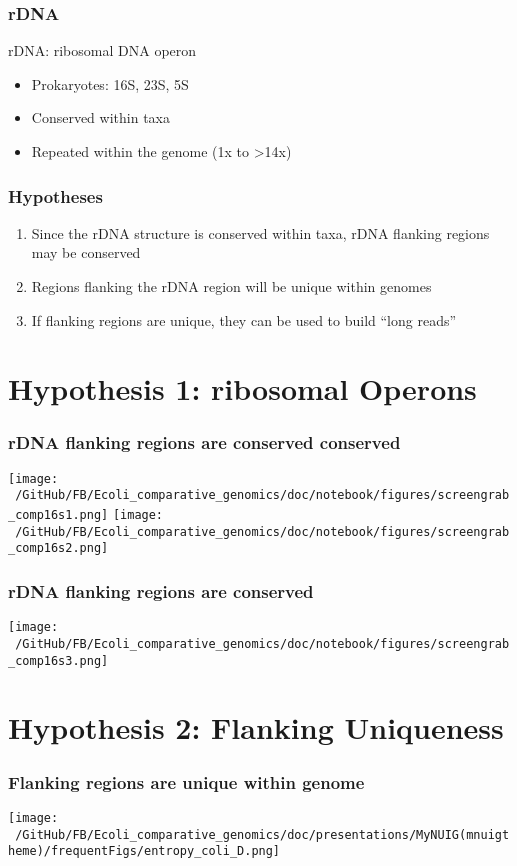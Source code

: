 \documentclass[10pt, compress]{beamer}
\begin{document}
\begin{frame}[fragile]
  \frametitle{rDNA}
  rDNA: ribosomal DNA operon
  \begin{itemize}
    \item Prokaryotes: 16S, 23S, 5S
    \item Conserved within taxa
    \item Repeated within the genome (1x to >14x)
    \end{itemize}
\end{frame}

\begin{frame}[fragile]
\frametitle{Hypotheses}
  \begin{enumerate}
  \item Since the rDNA structure is conserved within taxa, rDNA flanking regions may be conserved
  \item Regions flanking the rDNA region will be unique within genomes
  \item If flanking regions are unique, they can be used to build ``long reads''
\end{enumerate}
\end{frame}

\section{Hypothesis 1: ribosomal Operons}

\begin{frame}[fragile]
  \frametitle{rDNA flanking regions are conserved conserved}
  \centering
  \texttt{[image: ~/GitHub/FB/Ecoli\_comparative\_genomics/doc/notebook/figures/screengrab\_comp16s1.png]}
  \hfill
  \texttt{[image: ~/GitHub/FB/Ecoli\_comparative\_genomics/doc/notebook/figures/screengrab\_comp16s2.png]}
\end{frame}
\begin{frame}[fragile]
  \frametitle{rDNA flanking regions are conserved}
  \hspace*{1cm}
  \texttt{[image: ~/GitHub/FB/Ecoli\_comparative\_genomics/doc/notebook/figures/screengrab\_comp16s3.png]}
\end{frame}

\section{Hypothesis 2: Flanking Uniqueness}

\begin{frame}[fragile]
  \frametitle{Flanking regions are unique within genome}
  \hspace*{-1cm}
  \texttt{[image: ~/GitHub/FB/Ecoli\_comparative\_genomics/doc/presentations/MyNUIG(mnuigtheme)/frequentFigs/entropy\_coli\_D.png]}
\end{frame}
\end{document}
